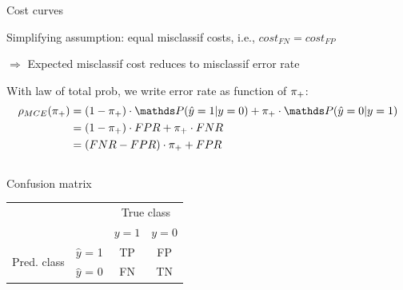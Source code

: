 \documentclass[11pt,compress,t,notes=noshow, xcolor=table]{beamer}
\begin{document}
\begin{vbframe}{Cost curves}
\small

Simplifying assumption: equal misclassif costs, i.e., $cost_{FN} = cost_{FP}$

$\Rightarrow$ Expected misclassif cost reduces to misclassif error rate

With law of total prob, we write error rate as function of $\pi_{+}$:
\begin{align*}
\rho_{MCE}(\rp)
&= (1 - \rp) \cdot \P(\hat y = 1 | y = 0) + \rp \cdot \P(\hat y = 0 | y = 1) \\
&= (1 - \rp) \cdot FPR + \rp \cdot FNR \\
&= (FNR - FPR) \cdot \rp + FPR
\end{align*}

\begin{columns}[T]
\begin{column}{0.5\textwidth}

\centerline{Confusion matrix}
\begin{tabular}{cc|cc}
    & &\multicolumn{2}{c}{True class} \\
    & & $y=1$ & $y=0$  \\
 \hline
    \multirow{2}{*}{\parbox{0.5cm}{Pred. class}}& $\hat y$ = 1     & TP                 & FP\\
    & $\hat y$ = 0 & FN              & TN\\
\end{tabular}
\end{column}


\end{columns}
\end{vbframe}
\end{document}
